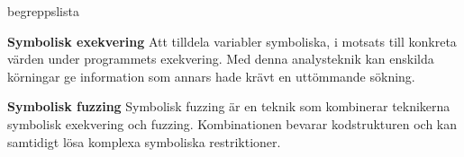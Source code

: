 \begin{labeling}{begreppslista}
  \item [\textbf{Symbolisk exekvering}] Att tilldela variabler symboliska, i
      motsats till konkreta värden under programmets exekvering. Med denna
      analysteknik kan enskilda körningar ge information som annars hade krävt
      en uttömmande sökning.

  \item [\textbf{Symbolisk fuzzing}] Symbolisk fuzzing är en teknik som
    kombinerar teknikerna symbolisk exekvering och fuzzing. Kombinationen 
    bevarar kodstrukturen och kan samtidigt lösa komplexa symboliska
    restriktioner.  
    
\end{labeling}
